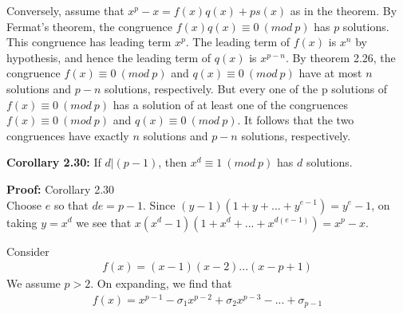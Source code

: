 \documentclass[a4paper]{article}
\begin{document}
Conversely, assume that $x^p-x=f(x)q(x)+ps(x)$ as in the theorem.
By Fermat's theorem, the congruence $f(x)q(x)\equiv 0\ (mod\ p)$ has $p$ solutions.
This congruence has leading term $x^p$. The leading term of $f(x)$ is $x^n$ by
hypothesis, and hence the leading term of $q(x)$ is $x^{p-n}$. By theorem 2.26,
the congruence $f(x)\equiv 0\ (mod\ p)$ and $q(x)\equiv 0\ (mod\ p)$ have at
most $n$ solutions and $p-n$ solutions, respectively. But every one of the p
solutions of $f(x)\equiv 0\ (mod\ p)$ has a solution of at least one of the
congruences $f(x)\equiv 0\ (mod\ p)$ and $q(x)\equiv 0\ (mod\ p)$. It follows
that the two congruences have exactly $n$ solutions and $p-n$ solutions, respectively.

\textbf{Corollary 2.30:}
If $d|(p-1)$, then $x^d\equiv 1\ (mod\ p)$ has $d$ solutions.

\textbf{Proof:} Corollary 2.30\\
Choose $e$ so that $de=p-1$. Since $(y-1)(1+y+...+y^{e-1})=y^e-1$, on taking $y=x^d$
we see that $x(x^d-1)(1+x^d+...+x^{d(e-1)})=x^p-x$.

Consider
\begin{align*}
    f(x)=(x-1)(x-2)...(x-p+1)
\end{align*}
We assume $p>2$. On expanding, we find that
\begin{align}
    f(x)=x^{p-1}-\sigma_{1}x^{p-2}+\sigma_{2}x^{p-3}-...+\sigma_{p-1}
\end{align}
\end{document}
